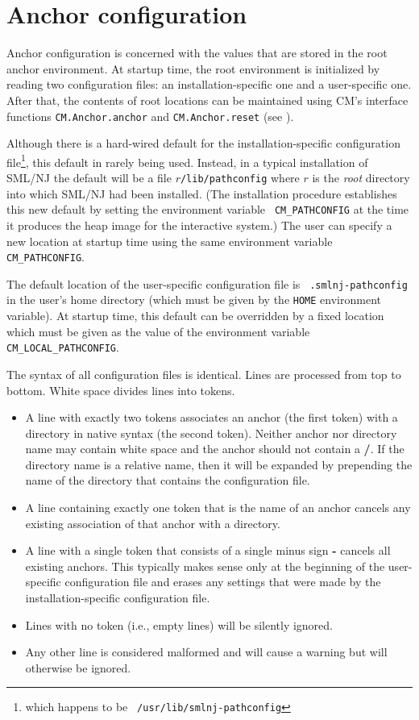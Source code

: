 \section{Anchor configuration}
\label{sec:anchor:config}

Anchor configuration is concerned with the values that are stored in
the root anchor environment.  At startup time, the root environment is
initialized by reading two configuration files: an
installation-specific one and a user-specific one.  After that, the
contents of root locations can be maintained using CM's interface
functions {\tt CM.Anchor.anchor} and {\tt CM.Anchor.reset} (see
).

Although there is a hard-wired default for the installation-specific
configuration file\footnote{which happens to be {\tt
/usr/lib/smlnj-pathconfig}}, this default in rarely being used.
Instead, in a typical installation of SML/NJ the default will be a
file $r${\tt /lib/pathconfig} where $r$ is the {\it root} directory
into which SML/NJ had been installed.  (The installation procedure
establishes this new default by setting the environment variable {\tt
CM\_PATHCONFIG} at the time it produces the heap image for
the interactive system.)  The user can specify a new location at
startup time using the same environment variable {\tt CM\_PATHCONFIG}.

The default location of the user-specific configuration file is {\tt
.smlnj-pathconfig} in the user's home directory (which must be given
by the {\tt HOME} environment variable).  At startup time, this
default can be overridden by a fixed location which must be given as
the value of the environment variable {\tt CM\_LOCAL\_PATHCONFIG}.

The syntax of all configuration files is identical.  Lines are
processed from top to bottom. White space divides lines into tokens.
\begin{itemize}
\item A line with exactly two tokens associates an anchor (the first
token) with a directory in native syntax (the second token).  Neither
anchor nor directory name may contain white space and the anchor
should not contain a {\bf /}.  If the directory name is a relative
name, then it will be expanded by prepending the name of the directory
that contains the configuration file.
\item A line containing exactly one token that is the name of an
anchor cancels any existing association of that anchor with a
directory.
\item A line with a single token that consists of a single minus sign
{\bf -} cancels all existing anchors.  This typically makes sense only
at the beginning of the user-specific configuration file and
erases any settings that were made by the installation-specific
configuration file.
\item Lines with no token (i.e., empty lines) will be silently ignored.
\item Any other line is considered malformed and will cause a warning
but will otherwise be ignored.
\end{itemize}

